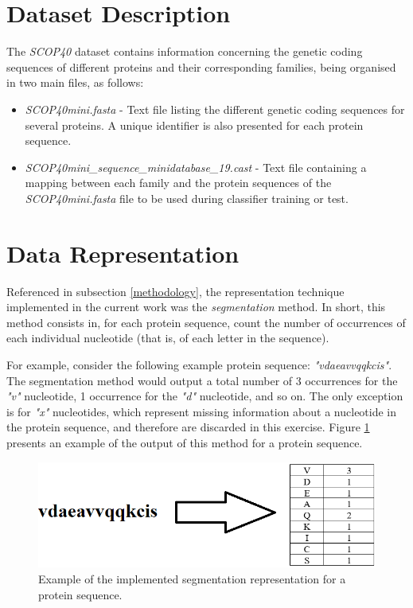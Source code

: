 \documentclass[11pt]{article}
\begin{document}
\section{Dataset Description}
\label{dataset_description}

The \emph{SCOP40} dataset contains information concerning the genetic coding sequences of different proteins and their corresponding families, being organised in two main files, as follows:

\begin{itemize}
	\item \emph{SCOP40mini.fasta} - Text file listing the different genetic coding sequences for several proteins. A unique identifier is also presented for each protein sequence.
	
	\item \emph{SCOP40mini\_sequence\_minidatabase\_19.cast} - Text file containing a mapping between each family and the protein sequences of the \emph{SCOP40mini.fasta} file to be used during classifier training or test.
\end{itemize}

\section{Data Representation}
\label{data_representation}

Referenced in subsection \ref{methodology}, the representation technique implemented in the current work was the \emph{segmentation} method. In short, this method consists in, for each protein sequence, count the number of occurrences of each individual nucleotide (that is, of each letter in the sequence).

For example, consider the following example protein sequence: \emph{"vdaeavvqqkcis"}. The segmentation method would output a total number of 3 occurrences for the \emph{"v"} nucleotide, 1 occurrence for the \emph{"d"} nucleotide, and so on. The only exception is for \emph{"x"} nucleotides, which represent missing information about a nucleotide in the protein sequence, and therefore are discarded in this exercise. Figure \ref{representation_example} presents an example of the output of this method for a protein sequence. 

\begin{figure}[h]
	\centering
	\includegraphics[scale=0.7]{images/representation.png}
	\caption{Example of the implemented segmentation representation for a protein sequence.}
	\label{representation_example}
\end{figure}
\end{document}
